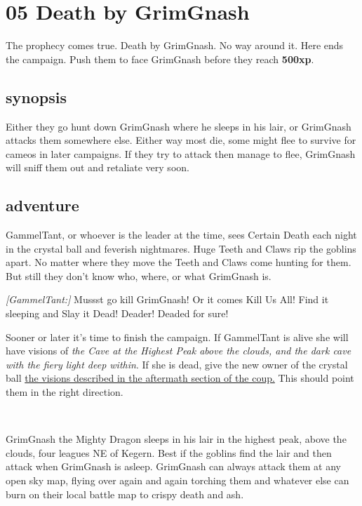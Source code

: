 \section*{05 Death by GrimGnash}
\label{05deathbygrimgnash}


The prophecy comes true. Death by GrimGnash. No way around it. Here ends the campaign. Push them to face GrimGnash before they reach \textbf{500xp}.


\subsection*{synopsis}

Either they go hunt down GrimGnash where he sleeps in his lair, or GrimGnash attacks them somewhere else. Either way most die, some might flee to survive for cameos in later campaigns. If they try to attack then manage to flee, GrimGnash will sniff them out and retaliate very soon.


\subsection*{adventure}

GammelTant, or whoever is the leader at the time, sees Certain Death each night in the crystal ball and feverish nightmares. Huge Teeth and Claws rip the goblins apart. No matter where they move the Teeth and Claws come hunting for them. But still they don't know who, where, or what GrimGnash is.

\begin{readoutloud}
\emph{[GammelTant:]} Mussst go kill GrimGnash! Or it comes Kill Us All! Find it sleeping and Slay it Dead! Deader! Deaded for sure!
\end{readoutloud}

Sooner or later it's time to finish the campaign. If GammelTant is alive she will have visions of \emph{the Cave at the Highest Peak above the clouds, and the dark cave with the fiery light deep within}. If she is dead, give the new owner of the crystal ball \hyperref[coupaftermath]{the visions described in the aftermath section of the coup.} This should point them in the right direction. 

\

\noindent GrimGnash the Mighty Dragon sleeps in his lair in the highest peak, above the clouds, four leagues NE of Kegern. Best if the goblins find the lair and then attack when GrimGnash is asleep. GrimGnash can always attack them at any open sky map, flying over again and again torching them and whatever else can burn on their local battle map to crispy death and ash.

